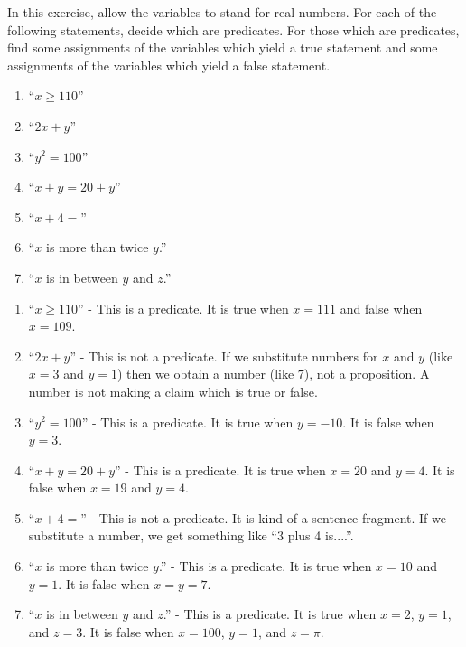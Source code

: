 \begin{xca}	
In this exercise, allow the variables to stand for real numbers. For each of the following statements, decide which are predicates. For those which are  predicates, find some assignments of the variables which yield a true statement and some assignments of the variables which yield a false statement.
	
\begin{enumerate}
			\item ``$x \geq 110$''
			\item ``$2x+y$''
			\item ``$y^2  = 100$''
			\item ``$x + y = 20 + y$''
			\item ``$x+4 = $''
			\item ``$x$ is more than twice $y$.''
			\item ``$x$ is in between $y$ and $z$.''
		\end{enumerate}
	\end{xca}

\begin{solutions}
	
\begin{enumerate}
	\item ``$x \geq 110$'' - This is a predicate.  It is true when $x = 111$ and false when $x = 109$.
	\item ``$2x+y$'' - This is not a predicate.  If we substitute numbers for $x$ and $y$ (like $x  = 3$  and $y=1$) then we obtain a number (like $7$), not a proposition.  A number is not making a claim which is true or false. 
	\item ``$y^2  = 100$'' - This is a predicate.  It is true when $y = -10$.  It is false when $y = 3$.
	\item ``$x + y = 20 + y$'' - This is a predicate.  It is true when $x = 20$ and $y=4$.  It is false when $x = 19$ and $y=4$.
	\item ``$x+4 = $'' - This is not a predicate.  It is kind of a sentence fragment.  If we substitute a number, we get something like ``3 plus 4 is....''. 
	\item ``$x$ is more than twice $y$.'' - This is a predicate.  It is true when $x = 10$ and $y=1$.  It is false when $x = y = 7$. 
	\item ``$x$ is in between $y$ and $z$.'' - This is a predicate.  It is true when $x = 2$, $y=1$, and $z = 3$.  It is false when $x = 100$, $y = 1$, and $z = \pi$.
\end{enumerate}
		
	\end{solutions}

